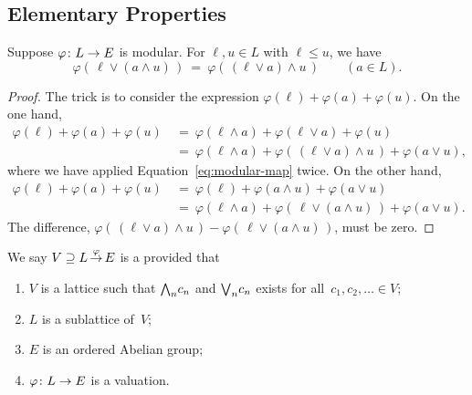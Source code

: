 \documentclass[main.tex]{subfiles}
\begin{document}
\subsection{Elementary Properties}
%
%
\begin{lem}
\label{L:modular-map-modular}
Suppose $\varphi\colon L \rightarrow E$ is modular.
For $\ell,u\in L$ with $\ell\leq u$, we have
\begin{equation}
\label{eq:modular-map}
\varphi(\,\ell \vee (a \wedge u)\,) 
\ =\ 
\varphi(\,(\ell\vee a)\wedge u\,)
\qquad (a\in L).
\end{equation}
\begin{proof}
The trick is to consider the expression 
$\varphi(\ell) + \varphi(a) + \varphi(u)$.
On the one hand,
\begin{align*}
\varphi(\ell) + \varphi(a) + \varphi(u)
\ &=\ \varphi(\ell\wedge a) + \varphi(\ell \vee a) + \varphi(u) \\
\ &=\ \varphi(\ell \wedge a)
      + \varphi(\,(\ell\vee a)\wedge u\,)
      + \varphi(a\vee u),
\end{align*}
where we have applied Equation~\eqref{eq:modular-map} twice.
On the other hand,
\begin{align*}
\varphi(\ell) + \varphi(a) + \varphi(u)
\ &=\ \varphi(\ell) + \varphi(a\wedge u) + \varphi(a \vee u) \\
\ &=\ \varphi(\ell \wedge a)
      + \varphi(\,\ell\vee (a\wedge u)\,)
      + \varphi(a\vee u).
\end{align*}
The difference,
$\varphi(\,(\ell\vee a)\wedge u\,)
- \varphi(\,\ell\vee (a\wedge u)\,)$,
must be zero.
\end{proof}
\end{lem}



%
%
\begin{dfn}
\label{D:simple-system}
We say $V \supseteq L\,\smash{\stackrel{\varphi}{\rightarrow}}\,E$
 is a 
provided that
\begin{enumerate}
\item \label{D:simple-system-1}
$V$ is a lattice
such that $\textstyle{\bigwedge}_n c_n$ and $\textstyle{\bigvee}_n c_n$ exists for all~$c_1,c_2,\dotsc\in V$;
\item \label{D:simple-system-2}
$L$ is a sublattice of~$V$;
\item \label{D:simple-system-3}
$E$ is an ordered Abelian group;
\item \label{D:simple-system-4}
$\varphi\colon L\rightarrow E$ is a valuation.
\end{enumerate}
\end{dfn}
\end{document}
